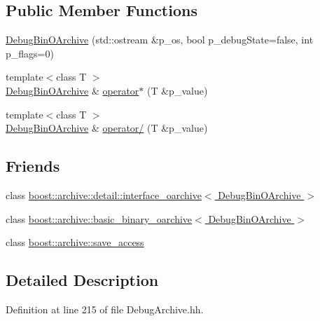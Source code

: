 \subsection*{Public Member Functions}
\begin{DoxyCompactItemize}
\item 
\hyperlink{classxtd_1_1serializer_1_1DebugBinOArchive_a24ef5240df842821499a32be217018ac}{Debug\-Bin\-O\-Archive} (std\-::ostream \&p\-\_\-os, bool p\-\_\-debug\-State=false, int p\-\_\-flags=0)
\item 
{\footnotesize template$<$class T $>$ }\\\hyperlink{classxtd_1_1serializer_1_1DebugBinOArchive}{Debug\-Bin\-O\-Archive} \& \hyperlink{classxtd_1_1serializer_1_1DebugBinOArchive_a47872bf2656b80e613d1b6d946437be2}{operator$\ast$} (T \&p\-\_\-value)
\item 
{\footnotesize template$<$class T $>$ }\\\hyperlink{classxtd_1_1serializer_1_1DebugBinOArchive}{Debug\-Bin\-O\-Archive} \& \hyperlink{classxtd_1_1serializer_1_1DebugBinOArchive_a6312cd274de08133d15bcda75d61762e}{operator/} (T \&p\-\_\-value)
\end{DoxyCompactItemize}
\subsection*{Friends}
\begin{DoxyCompactItemize}
\item 
class \hyperlink{classxtd_1_1serializer_1_1DebugBinOArchive_a8319d9e2864d97444125a3c4701611a2}{boost\-::archive\-::detail\-::interface\-\_\-oarchive$<$ Debug\-Bin\-O\-Archive $>$}
\item 
class \hyperlink{classxtd_1_1serializer_1_1DebugBinOArchive_a7b9f0abe54deccaffaf59bd14a6f9f53}{boost\-::archive\-::basic\-\_\-binary\-\_\-oarchive$<$ Debug\-Bin\-O\-Archive $>$}
\item 
class \hyperlink{classxtd_1_1serializer_1_1DebugBinOArchive_aaca003bb8a4fc59424e4025130da4edd}{boost\-::archive\-::save\-\_\-access}
\end{DoxyCompactItemize}


\subsection{Detailed Description}


Definition at line 215 of file Debug\-Archive.\-hh.



